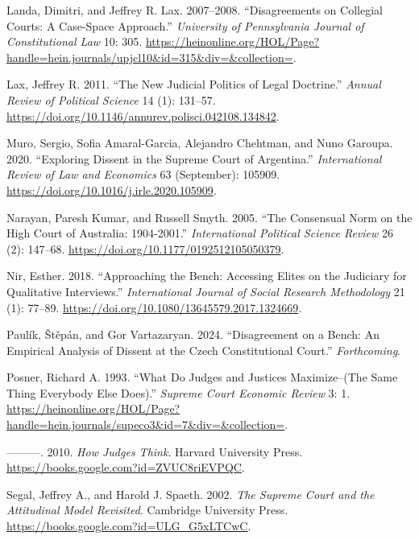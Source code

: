 \documentclass[
  11pt,
]{article}
\newlength{\cslhangindent}
\newenvironment{CSLReferences}[2] %
 {\begin{list}{}{%
  \setlength{\itemindent}{0pt}
  \setlength{\leftmargin}{0pt}
  \setlength{\parsep}{0pt}
  \ifodd #1
   \setlength{\leftmargin}{\cslhangindent}
   \setlength{\itemindent}{-1\cslhangindent}
  \fi
  \setlength{\itemsep}{#2\baselineskip}}}
 {\end{list}}
\begin{document}
\begin{CSLReferences}{1}{0}
Landa, Dimitri, and Jeffrey R. Lax. 2007--2008. {``Disagreements on {Collegial Courts}: {A Case-Space Approach}.''} \emph{University of Pennsylvania Journal of Constitutional Law} 10: 305. \url{https://heinonline.org/HOL/Page?handle=hein.journals/upjcl10&id=315&div=&collection=}.

Lax, Jeffrey R. 2011. {``The {New Judicial Politics} of {Legal Doctrine}.''} \emph{Annual Review of Political Science} 14 (1): 131--57. \url{https://doi.org/10.1146/annurev.polisci.042108.134842}.

Muro, Sergio, Sofia Amaral-Garcia, Alejandro Chehtman, and Nuno Garoupa. 2020. {``Exploring Dissent in the {Supreme Court} of {Argentina}.''} \emph{International Review of Law and Economics} 63 (September): 105909. \url{https://doi.org/10.1016/j.irle.2020.105909}.

Narayan, Paresh Kumar, and Russell Smyth. 2005. {``The {Consensual Norm} on the {High Court} of {Australia}: 1904-2001.''} \emph{International Political Science Review} 26 (2): 147--68. \url{https://doi.org/10.1177/0192512105050379}.

Nir, Esther. 2018. {``Approaching the Bench: Accessing Elites on the Judiciary for Qualitative Interviews.''} \emph{International Journal of Social Research Methodology} 21 (1): 77--89. \url{https://doi.org/10.1080/13645579.2017.1324669}.

Paulík, Štěpán, and Gor Vartazaryan. 2024. {``Disagreement on a Bench: An Empirical Analysis of Dissent at the {Czech Constitutional Court}.''} \emph{Forthcoming}.

Posner, Richard A. 1993. {``What {Do Judges} and {Justices Maximize--}({The Same Thing Everybody Else Does}).''} \emph{Supreme Court Economic Review} 3: 1. \url{https://heinonline.org/HOL/Page?handle=hein.journals/supeco3&id=7&div=&collection=}.

---------. 2010. \emph{How {Judges Think}}. Harvard University Press. \url{https://books.google.com?id=ZVUC8riEVPQC}.

Segal, Jeffrey A., and Harold J. Spaeth. 2002. \emph{The {Supreme Court} and the {Attitudinal Model Revisited}}. Cambridge University Press. \url{https://books.google.com?id=ULG_G5xLTCwC}.


\end{CSLReferences}
\end{document}
